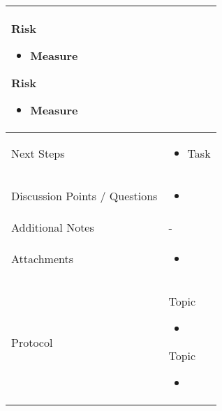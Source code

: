 \documentclass[a4paper,11pt]{article}
\begin{document}
\begin{longtable}{|p{3.5cm}|p{12cm}|}
		Risk
		\begin{itemize}
			\item Measure
		\end{itemize}
		
		Risk
		\begin{itemize}
			\item Measure
		\end{itemize}
		
		 \\
		
		\hline
		Next Steps & \begin{itemize}
			\item Task
		\end{itemize} \\
		\hline
		Discussion Points / Questions & \begin{itemize}
			\item 
		\end{itemize} \\
		\hline
		Additional Notes & - \\
		\hline
		Attachments  & \begin{itemize}
			\item 
		\end{itemize} \\
		\hline
		Protocol  & 
		Topic
		\begin{itemize}
			\item 
		\end{itemize}
		
		Topic
		\begin{itemize}
			\item 
		\end{itemize} \\
		\hline
	\end{longtable}
	
\end{document}
